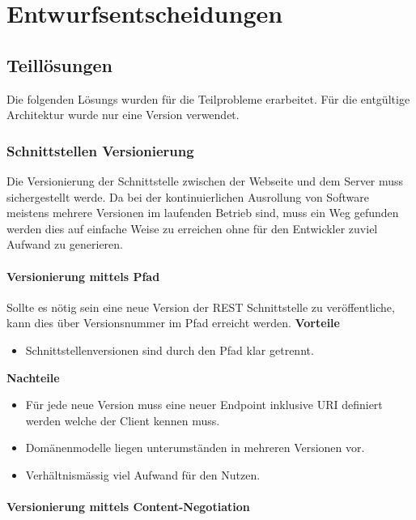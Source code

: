 \chapter{Entwurfsentscheidungen}

\section{Teillösungen}

Die folgenden Lösungs wurden für die Teilprobleme erarbeitet. Für die entgültige Architektur wurde nur eine Version verwendet.

\subsection{Schnittstellen Versionierung}

Die Versionierung der Schnittstelle zwischen der Webseite und dem Server muss sichergestellt werde. Da bei der kontinuierlichen Ausrollung von Software meistens mehrere Versionen im laufenden Betrieb sind, muss ein Weg gefunden werden dies auf einfache Weise zu erreichen ohne für den Entwickler zuviel Aufwand zu generieren.

\subsubsection{Versionierung mittels Pfad}

Sollte es nötig sein eine neue Version der \Gls{REST} Schnittstelle zu veröffentliche, kann dies über Versionsnummer im Pfad erreicht werden. 
\newline
\newline
\textbf{Vorteile}
\begin{itemize}
	\item Schnittstellenversionen sind durch den Pfad klar getrennt.
\end{itemize}
\textbf{Nachteile}
\begin{itemize}
	\item Für jede neue Version muss eine neuer Endpoint inklusive URI definiert werden welche der Client kennen muss.
	\item Domänenmodelle liegen unterumständen in mehreren Versionen vor.
	\item Verhältnismässig viel Aufwand für den Nutzen.
\end{itemize}

\subsubsection{Versionierung mittels Content-Negotiation}

